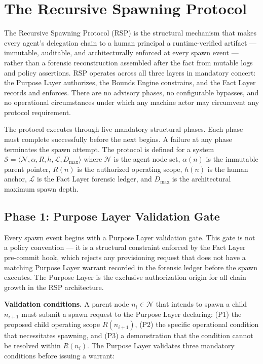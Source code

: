 \section{The Recursive Spawning Protocol}
\label{sec:rs-protocol}

The Recursive Spawning Protocol (RSP) is the structural mechanism that makes every agent's delegation chain to a human principal a runtime-verified artifact — immutable, auditable, and architecturally enforced at every spawn event — rather than a forensic reconstruction assembled after the fact from mutable logs and policy assertions. RSP operates across all three \bxthree{} layers in mandatory concert: the Purpose Layer authorizes, the Bounds Engine constrains, and the Fact Layer records and enforces. There are no advisory phases, no configurable bypasses, and no operational circumstances under which any machine actor may circumvent any protocol requirement.

The protocol executes through five mandatory structural phases. Each phase must complete successfully before the next begins. A failure at any phase terminates the spawn attempt. The protocol is defined for a system $\mathcal{S} = \langle \mathcal{N}, \alpha, R, h, \mathcal{L}, D_{\max} \rangle$ where $\mathcal{N}$ is the agent node set, $\alpha(n)$ is the immutable parent pointer, $R(n)$ is the authorized operating scope, $h(n)$ is the human anchor, $\mathcal{L}$ is the Fact Layer forensic ledger, and $D_{\max}$ is the architectural maximum spawn depth.

\subsection{Phase 1: Purpose Layer Validation Gate}
\label{sec:rs-phase1}

Every spawn event begins with a Purpose Layer validation gate. This gate is not a policy convention — it is a structural constraint enforced by the Fact Layer pre-commit hook, which rejects any provisioning request that does not have a matching Purpose Layer warrant recorded in the forensic ledger before the spawn executes. The Purpose Layer is the exclusive authorization origin for all chain growth in the RSP architecture.

\medskip
\noindent\textbf{Validation conditions.} A parent node $n_i \in \mathcal{N}$ that intends to spawn a child $n_{i+1}$ must submit a spawn request to the Purpose Layer declaring: (P1) the proposed child operating scope $R(n_{i+1})$, (P2) the specific operational condition that necessitates spawning, and (P3) a demonstration that the condition cannot be resolved within $R(n_i)$. The Purpose Layer validates three mandatory conditions before issuing a warrant:


